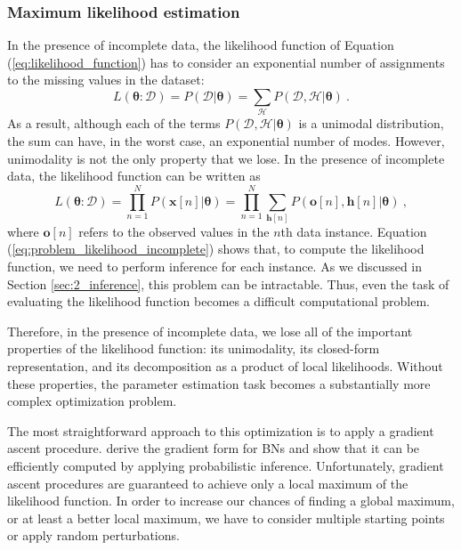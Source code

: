 \subsubsection*{Maximum likelihood estimation}
In the presence of incomplete data, the likelihood function of Equation (\ref{eq:likelihood_function}) has to consider an exponential number of assignments to the missing values in the dataset: 
\begin{equation*}
L(\bm{\theta} :  \mathcal{D}) = P(\mathcal{D} | \bm{\theta}) =  \sum_{\mathcal{H}} P(\mathcal{D}, \mathcal{H} | \bm{\theta}) \ .
\end{equation*}
As a result, although each of the terms $P(\mathcal{D}, \mathcal{H}| \bm{\theta})$ is a unimodal distribution, the sum can have, in the worst case, an exponential number of modes. However, unimodality is not the only property that we lose. In the presence of incomplete data, the likelihood function can be written as
\begin{equation} \label{eq:problem_likelihood_incomplete}
L(\bm{\theta} :  \mathcal{D}) = \prod_{n=1}^{N} P(\mathbf{x}[n] | \bm{\theta}) = \prod_{n=1}^{N} \sum_{\mathbf{h}[n]} P (\mathbf{o}[n], \mathbf{h}[n] | \bm{\theta}) \ ,
\end{equation}
where $\mathbf{o}[n]$ refers to the observed values in the $n$th data instance. Equation (\ref{eq:problem_likelihood_incomplete}) shows that, to compute the likelihood function, we need to perform inference for each instance. As we discussed in Section \ref{sec:2_inference}, this problem can be intractable. Thus, even the task of evaluating the likelihood function becomes a difficult computational problem.

Therefore, in the presence of incomplete data, we lose all of the important properties of the likelihood function: its unimodality, its closed-form representation, and its decomposition as a product of local likelihoods. Without these properties, the parameter estimation task becomes a substantially more complex optimization problem.


The most straightforward approach to this optimization is to apply a gradient ascent procedure. \cite{binder1997} derive the gradient form for BNs and show that it can be efficiently computed by applying probabilistic inference. Unfortunately, gradient ascent procedures are guaranteed to achieve only a local maximum of the likelihood function. In order to increase our chances of finding a global maximum, or at least a better local maximum, we have to consider multiple starting points or apply random perturbations.

